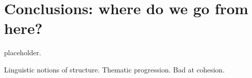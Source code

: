 \chapter{Conclusions: where do we go from here?}
placeholder.


Linguistic notions of structure.
Thematic progression.
Bad at cohesion.
